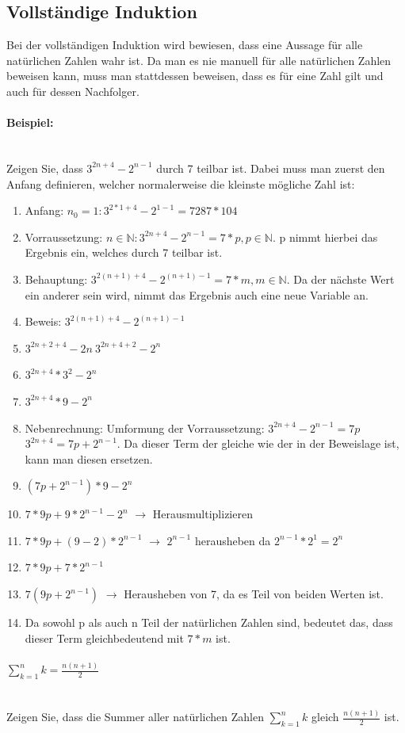 \documentclass{article}
\newcommand{\paragraphlb}[1]{\paragraph{#1}\mbox{}\\}
\newcommand{\N}{\mathbb{N}}
\begin{document}
	\subsection{Vollständige Induktion}
	Bei der vollständigen Induktion wird bewiesen, dass eine Aussage für alle natürlichen Zahlen wahr ist. Da man es nie manuell für alle natürlichen Zahlen beweisen kann, muss man stattdessen beweisen, dass es für eine Zahl gilt und auch für dessen Nachfolger.
	\paragraphlb{Beispiel:}
	Zeigen Sie, dass $3^{2n+4}-2^{n-1}$ durch 7 teilbar ist. Dabei muss man zuerst den Anfang definieren, welcher normalerweise die kleinste mögliche Zahl ist: \\
	\begin{enumerate}
		\item{Anfang: $n_0=1: 3^{2*1+4}-2^{1-1}=728$\to$ 7*104$}
		\item{Vorraussetzung: $n\in\N: 3^{2n+4}-2^{n-1}=7*p, p\in\N$. p nimmt hierbei das Ergebnis ein, welches durch 7 teilbar ist.}
		\item{Behauptung: $3^{2(n+1)+4}-2^{(n+1)-1} = 7*m, m\in\N$. Da der nächste Wert ein anderer sein wird, nimmt das Ergebnis auch eine neue Variable an.}
		\item{Beweis: $3^{2(n+1)+4}-2^{(n+1)-1}$}
		\item{$3^{2n+2+4}-2{n}\ $\to$ 3^{2n+4+2}-2^n$}
		\item{$3^{2n+4}*3^2-2^n$}
		\item{$3^{2n+4}*9-2^n$}
		\item{Nebenrechnung: Umformung der Vorraussetzung: $3^{2n+4}-2^{n-1} = 7p $\to$ 3^{2n+4} = 7p+2^{n-1}$. Da dieser Term der gleiche wie der in der Beweislage ist, kann man diesen ersetzen.}
		\item{$(7p+2^{n-1})*9-2^n$}
		\item{$7*9p+9*2^{n-1}-2^n$ $\to$ Herausmultiplizieren}
		\item{$7*9p+(9-2)*2^{n-1}$ $\to$ $2^{n-1}$ herausheben da $2^{n-1}*2^1 = 2^n$}
		\item{$7*9p + 7*2^{n-1}$}
		\item{$7(9p+2^{n-1})$ $\to$ Herausheben von 7, da es Teil von beiden Werten ist.}
		\item{Da sowohl p als auch n Teil der natürlichen Zahlen sind, bedeutet das, dass dieser Term gleichbedeutend mit $7*m$ ist.}
	\end{enumerate}
	\paragraphlb{$\sum^n_{k=1}{k}=\frac{n(n+1)}{2}$}
	Zeigen Sie, dass die Summer aller natürlichen Zahlen $\sum^n_{k=1}{k}$ gleich $\frac{n(n+1)}{2}$ ist. \\
\end{document}
